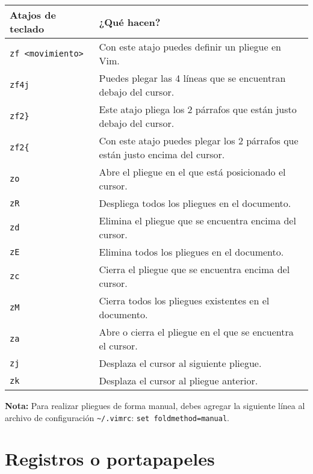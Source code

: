 \documentclass[
  doc,
  floatsintext,
  longtable,
  a4paper,
  nolmodern,
  notxfonts,
  notimes,
  colorlinks=true,linkcolor=blue,citecolor=blue,urlcolor=blue]{apa7}
\begin{document}
\begin{longtable}[]{@{}
  >{\raggedright\arraybackslash}p{}
  >{\raggedright\arraybackslash}p{}@{}}
\toprule\noalign{}
\begin{minipage}[b]{\linewidth}\raggedright
Atajos de teclado
\end{minipage} & \begin{minipage}[b]{\linewidth}\raggedright
¿Qué hacen?
\end{minipage} \\
\midrule\noalign{}
\endhead
\bottomrule\noalign{}
\endlastfoot
\texttt{zf\ \textless{}movimiento\textgreater{}} & Con este atajo puedes
definir un pliegue en Vim. \\
\texttt{zf4j} & Puedes plegar las 4 líneas que se encuentran debajo del
cursor. \\
\texttt{zf2\}} & Este atajo pliega los 2 párrafos que están justo debajo
del cursor. \\
\texttt{zf2\{} & Con este atajo puedes plegar los 2 párrafos que están
justo encima del cursor. \\
\texttt{zo} & Abre el pliegue en el que está posicionado el cursor. \\
\texttt{zR} & Despliega todos los pliegues en el documento. \\
\texttt{zd} & Elimina el pliegue que se encuentra encima del cursor. \\
\texttt{zE} & Elimina todos los pliegues en el documento. \\
\texttt{zc} & Cierra el pliegue que se encuentra encima del cursor. \\
\texttt{zM} & Cierra todos los pliegues existentes en el documento. \\
\texttt{za} & Abre o cierra el pliegue en el que se encuentra el
cursor. \\
\texttt{zj} & Desplaza el cursor al siguiente pliegue. \\
\texttt{zk} & Desplaza el cursor al pliegue anterior. \\
\end{longtable}

\textbf{Nota:} Para realizar pliegues de forma manual, debes agregar la
siguiente línea al archivo de configuración
\texttt{\textasciitilde{}/.vimrc}: \texttt{set\ foldmethod=manual}.

\section{Registros o portapapeles}\label{registros-o-portapapeles}
\end{document}
